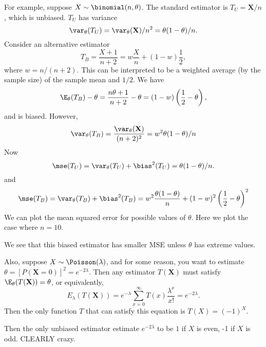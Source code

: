 \documentclass[a4paper]{article}
\begin{document}
For example, suppose $X\sim \binomial(n, \theta)$. The standard estimator is $T_U = \mathbf{X}/n$, which is unbiased. $T_U$ has variance
\[
  \var_\theta(T_U) = \var_\theta(\mathbf{X})/n^2 = \theta(1 - \theta)/n.
\]
Consider an alternative estimator 
\[
  T_B = \frac{X + 1}{n + 2} = w\frac{X}{n} + (1 - w)\frac{1}{2},
\]
where $w = n/(n + 2)$. This can be interpreted to be a weighted average (by the sample size) of the sample mean and $1/2$. We have
\[
  \E_\theta(T_B) - \theta = \frac{n\theta + 1}{n + 2} - \theta = (1 - w)\left(\frac{1}{2} - \theta\right),
\]
and is biased. However,
\[
  \var_\theta(T_B) = \frac{\var_\theta(\mathbf{X})}{(n + 2)^2} = w^2\theta(1 - \theta)/n
\]
Now
\[
  \mse (T_U) = \var_\theta(T_U) + \bias^2(T_U) = \theta(1 - \theta)/n.
\]
and
\[
  \mse (T_B) = \var_\theta(T_B) + \bias^2(T_B) = w^2\frac{\theta(1 - \theta)}{n} + (1 - w)^2\left(\frac{1}{2} - \theta\right)^2
\]
We can plot the mean squared error for possible values of $\theta$. Here we plot the case where $n =1 0$.
\begin{center}
\end{center}
We see that this biased estimator has smaller MSE unless $\theta$ has extreme values.

Also, suppose $X\sim \Poisson(\lambda)$, and for some reason, you want to estimate $\theta = [P(\mathbf{X} = 0)]^2 = e^{-2\lambda}$. Then any estimator $T(\mathbf{X})$ must satisfy $\E_\theta(T(\mathbf{X})) = \theta$, or equivalently,
\[
  E_\lambda(T(\mathbf{X})) = e^{-\lambda}\sum_{x = 0}^\infty T(x) \frac{\lambda^x}{x!} = e^{-2\lambda}.
\]
Then the only function $T$ that can satisfy this equation is $T(X) = (-1)^X$.

Then the only unbiased estimator estimate $e^{-2\lambda}$ to be $1$ if $X$ is even, -1 if $X$ is odd. CLEARLY crazy. 
\end{document}
